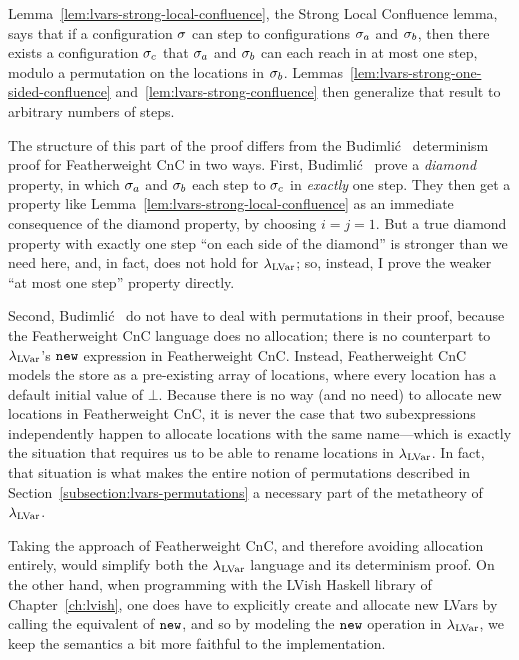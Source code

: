 Lemma~\ref{lem:lvars-strong-local-confluence}, the Strong Local
Confluence lemma, says that if a configuration $\sigma$ can step to
configurations $\sigma_a$ and $\sigma_b$, then there exists a
configuration $\sigma_c$ that $\sigma_a$ and $\sigma_b$ can each reach in
at most one step, modulo a permutation on the locations in $\sigma_b$.
Lemmas~\ref{lem:lvars-strong-one-sided-confluence}
and~\ref{lem:lvars-strong-confluence} then generalize that result to
arbitrary numbers of steps.

The structure of this part of the proof differs from the Budimli\'c
\etal~determinism proof for Featherweight CnC in two ways.  First,
Budimli\'c \etal~prove a \emph{diamond} property, in which $\sigma_a$
and $\sigma_b$ each step to $\sigma_c$ in \emph{exactly} one step.  They
then get a property like Lemma~\ref{lem:lvars-strong-local-confluence}
as an immediate consequence of the diamond property, by choosing $i =
j = 1$.  But a true diamond property with exactly one step ``on each
side of the diamond'' is stronger than we need here, and, in fact,
does not hold for $\lambda_{\textrm{LVar}}$; so, instead, I prove the weaker ``at
most one step'' property directly.

Second, Budimli\'c \etal~do not have to deal with permutations in
their proof, because the Featherweight CnC language does no
allocation; there is no counterpart to $\lambda_{\textrm{LVar}}$'s $\mbox{\texttt{new}}$
expression in Featherweight CnC.  Instead, Featherweight CnC models
the store as a pre-existing array of locations, where every location
has a default initial value of $\bot$.  Because there is no way (and
no need) to allocate new locations in Featherweight CnC, it is never
the case that two subexpressions independently happen to allocate
locations with the same name---which is exactly the situation that
requires us to be able to rename locations in $\lambda_{\textrm{LVar}}$.  In fact,
that situation is what makes the entire notion of permutations
described in Section~\ref{subsection:lvars-permutations} a necessary
part of the metatheory of $\lambda_{\textrm{LVar}}$.

Taking the approach of Featherweight CnC, and therefore avoiding
allocation entirely, would simplify both the $\lambda_{\textrm{LVar}}$ language
and its determinism proof.  On the other hand, when programming with
the LVish Haskell library of Chapter~\ref{ch:lvish}, one does have to
explicitly create and allocate new LVars by calling the equivalent of
$\mbox{\texttt{new}}$, and so by modeling the $\mbox{\texttt{new}}$ operation in $\lambda_{\textrm{LVar}}$, we
keep the semantics a bit more faithful to the implementation.

